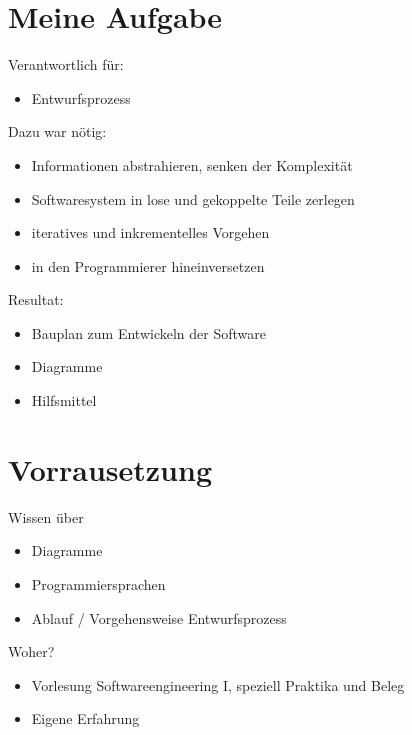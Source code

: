 \documentclass[ignorenonframetext, 11pt, table]{beamer}
\begin{document}
\section{Meine Aufgabe}
\begin{frame}
	Verantwortlich für:
	\begin{itemize}
		\setlength\itemsep{0.2em}
		\item Entwurfsprozess \newline \newline \pause
		
	\end{itemize}		
	Dazu war nötig:
	\begin{itemize}
		\setlength\itemsep{0.2em}
		\item Informationen abstrahieren, senken der Komplexität \pause
		\item Softwaresystem in lose und gekoppelte Teile zerlegen 	\pause
		\item iteratives und inkrementelles Vorgehen 	\pause
		\item in den Programmierer hineinversetzen 
	\end{itemize}\pause
	Resultat:
	\begin{itemize}
		\setlength\itemsep{0.2em}
		\item Bauplan zum Entwickeln der Software
		\item Diagramme 
		\item Hilfsmittel
	\end{itemize}
\end{frame}


\section{Vorrausetzung}
\begin{frame}
	Wissen über
	\begin{itemize}
		\setlength\itemsep{0.2em}
		\item Diagramme
		\item Programmiersprachen
		\item Ablauf / Vorgehensweise Entwurfsprozess
	\end{itemize}	\pause
	Woher?
	\begin{itemize}
		\setlength\itemsep{0.2em}
		\item Vorlesung Softwareengineering I, speziell Praktika und Beleg 
		\item Eigene Erfahrung
	\end{itemize}
\end{frame}
\end{document}
